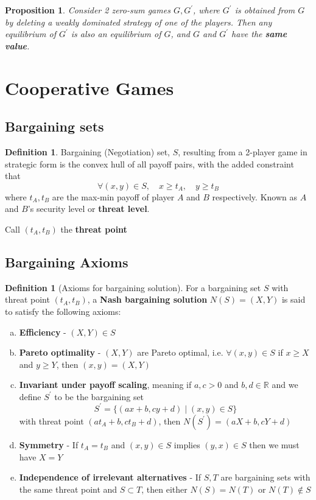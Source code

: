 \documentclass[11pt]{article}
\theoremstyle{plain}
\newtheorem{proposition}[theorem]{Proposition}
\theoremstyle{definition}
\newtheorem{definition}[theorem]{Definition}
\theoremstyle{remark}
\newcommand{\R}{\mathbb{R}}
\begin{document}
\begin{proposition}
    Consider 2 zero-sum games \(G, G^\prime \), where \(G^\prime \) is obtained from \(G\) by deleting a weakly dominated strategy of one of the players. Then any equilibrium of \(G^\prime \) is also an equilibrium of \(G\), and \(G\) and \(G^\prime \) have the \textbf{same value}.
\end{proposition}

\section{Cooperative Games}

\subsection{Bargaining sets}

\setcounter{theorem}{30} 
\begin{definition}
    Bargaining (Negotiation) set, \(S\), resulting from a 2-player game in strategic form is the convex hull of all payoff pairs, with the added constraint that
    \[
        \forall (x,y) \in S, \quad x \geq t_{A}, \quad y \geq t_{B}
    \]
    where \(t_{A}, t_{B}\) are the max-min payoff of player \(A\) and \(B\) respectively.
    Known as \(A\) and \(B\)'s security level or \textbf{threat level}.

    Call \((t_{A}, t_{B})\) the \textbf{threat point} 
\end{definition}

\subsection{Bargaining Axioms}

\begin{definition}[Axioms for bargaining solution]
    For a bargaining set \(S\) with threat point \((t_{A}, t_{B})\), a \textbf{Nash bargaining solution} \(N(S) = (X,Y)\)   is said to satisfy the following axioms:
    \begin{enumerate}[(a)]
        \item \textbf{Efficiency} - \((X,Y) \in S\)
        \item \textbf{Pareto optimality} - \((X,Y)\) are Pareto optimal, i.e. \(\forall (x,y) \in S\) if \(x \geq X\) and \(y \geq Y\), then \((x,y) = (X,Y)\)
        \item \textbf{Invariant under payoff scaling}, meaning if \(a,c > 0\) and \(b,d \in \R\) and we define \(S^\prime \) to be the bargaining set
        \[
            S^\prime  = \{ (ax + b, cy + d) \mid (x,y) \in S\}
        \]
        with threat point \((at_{A} + b, ct_{B} + d)\), then \(N(S^\prime) = (aX + b, cY + d)\)
        \item \textbf{Symmetry} - If \(t_A = t_B\) and \((x,y) \in S\) implies \((y,x) \in S\) then we must have \(X = Y\)
        \item \textbf{Independence of irrelevant alternatives} - If \(S,T\) are bargaining sets with the same threat point and \(S \subset T\), then either \(N(S) = N(T)\) or \(N(T) \notin S\)
    \end{enumerate}
\end{definition}
\end{document}
